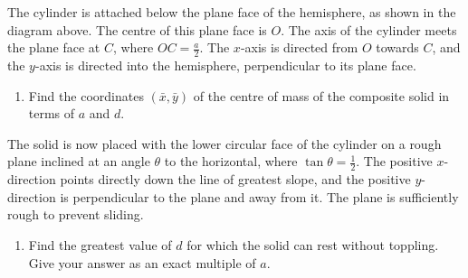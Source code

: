 \documentclass[leqno]{article}
\begin{document}
\begin{enumerate}[
  label=\textbf{\arabic*.},
  leftmargin=*,
  topsep=0pt,
  partopsep=0pt,
  parsep=0pt
]
The cylinder is attached below the plane face of the hemisphere, as shown in the diagram above. The centre of this plane face is $O$. The axis of the cylinder meets the plane face at $C$, where $OC=\frac{a}{2}$. The $x$-axis is directed from $O$ towards $C$, and the $y$-axis is directed into the hemisphere, perpendicular to its plane face. \\
\begin{enumerate}[label=\textbf{(\alph*)}]
\item Find the coordinates $(\bar{x},\bar{y})$ of the centre of mass of the composite solid in terms of $a$ and $d$.  \\
\end{enumerate}
The solid is now placed with the lower circular face of the cylinder on a rough plane inclined at an angle $\theta$ to the horizontal, where $\tan\theta=\frac{1}{2}$. The positive $x$-direction points directly down the line of greatest slope, and the positive $y$-direction is perpendicular to the plane and away from it. The plane is sufficiently rough to prevent sliding. \\
\begin{enumerate}[label=\textbf{(\alph*)}, resume]
\item Find the greatest value of $d$ for which the solid can rest without toppling. Give your answer as an exact multiple of $a$.  \\
\end{enumerate}

\newpage

\questionitem


\end{enumerate}
\end{document}
